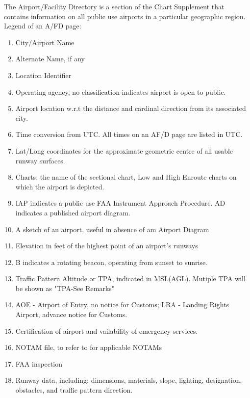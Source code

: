 \documentclass[12pt]{article}
\begin{document}
				The Airport/Facility Directory is a section of the Chart Supplement that contains information on all public use airports in a particular geographic region.\\

				Legend of an A/FD page:\\
				\begingroup
				\fontsize{8pt}{10pt}
				\begin{multicols}{2}
				\begin{enumerate}
					\item City/Airport Name
					\item Alternate Name, if any
					\item Location Identifier
					\item Operating agency, no classification indicates airport is open to public.
					\item Airport location w.r.t the distance and cardinal direction from its associated city.
					\item Time conversion from UTC. All times on an AF/D page are listed in UTC.
					\item Lat/Long coordinates for the approximate geometric centre of all usable runway surfaces.
					\item Charts: the name of the sectional chart, Low and High Enroute charts on which the airport is depicted.
					\item IAP indicates a public use FAA Instrument Approach Procedure. AD indicates a published airport diagram.
					\item A sketch of an airport, useful in absence of am Airport Diagram
					\item Elevation in feet of the highest point of an airport's runways
					\item B indicates a rotating beacon, operating from sunset to sunrise.
					\item Traffic Pattern Altitude or TPA, indicated in MSL(AGL). Mutiple TPA will be shown as "TPA-See Remarks"
					\item AOE - Airport of Entry, no notice for Customs; LRA - Landing Rights Airport, advance notice for Customs.
					\item Certification of airport and vailability of emergency services.
					\item NOTAM file, to refer to for applicable NOTAMs
					\item FAA inspection
					\item Runway data, including: dimensions, materials, slope, lighting, designation, obstacles, and traffic pattern direction.

\end{enumerate}
\end{multicols}
\end{document}

